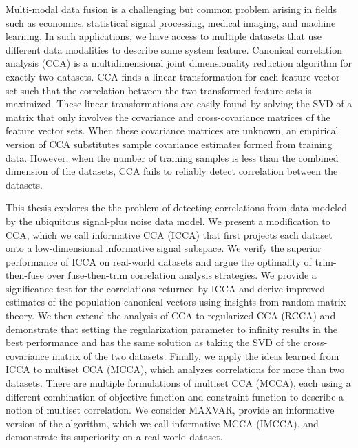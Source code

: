 Multi-modal data fusion is a challenging but common problem arising in fields such as
economics, statistical signal processing, medical imaging, and machine learning. In such
applications, we have access to multiple datasets that use different data modalities to
describe some system feature. Canonical correlation analysis (CCA) is a multidimensional
joint dimensionality reduction algorithm for exactly two datasets. CCA finds a
linear transformation for each feature vector set such that the correlation between the
two transformed feature sets is maximized. These linear transformations are easily found
by solving the SVD of a matrix that only involves the covariance and cross-covariance
matrices of the feature vector sets. When these covariance matrices are unknown, an
empirical version of CCA substitutes sample covariance estimates formed from training
data. However, when the number of training samples is less than the combined dimension of
the datasets, CCA fails to reliably detect correlation between the datasets. 

This thesis explores the the problem of detecting correlations from data modeled by the
ubiquitous signal-plus noise data model. We present a modification to CCA, which we call
informative CCA (ICCA) that first projects each dataset onto a low-dimensional informative
signal subspace. We verify the superior performance of ICCA on real-world datasets and
argue the optimality of trim-then-fuse over fuse-then-trim correlation analysis
strategies. We provide a significance test for the correlations returned by ICCA and
derive improved estimates of the population canonical vectors using insights from random
matrix theory. We then extend the analysis of CCA to regularized CCA (RCCA) and
demonstrate that setting the regularization parameter to infinity results in the best
performance and has the same solution as taking the SVD of the cross-covariance matrix
of the two datasets. Finally, we apply the ideas learned from ICCA to multiset CCA (MCCA),
which analyzes correlations for more than two datasets. There are multiple formulations of
multiset CCA (MCCA), each using a different combination of objective function and
constraint function to describe a notion of multiset correlation. We consider MAXVAR,
provide an informative version of the algorithm, which we call informative MCCA (IMCCA),
and demonstrate its superiority on a real-world dataset.

